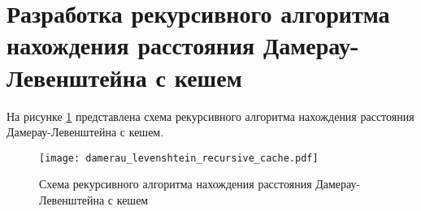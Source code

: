 \section{Разработка рекурсивного алгоритма нахождения расстояния Дамерау-Левенштейна с кешем}
На рисунке \ref{img:damerau_levenshtein_recursive_cache_schema} представлена схема рекурсивного алгоритма нахождения расстояния Дамерау-Левенштейна с кешем.

\begin{figure}[h!]
    \centering
    \texttt{[image: damerau\_levenshtein\_recursive\_cache.pdf]}
    \caption{Схема рекурсивного алгоритма нахождения расстояния Дамерау-Левенштейна с кешем}
    \label{img:damerau_levenshtein_recursive_cache_schema}
\end{figure}

\newpage